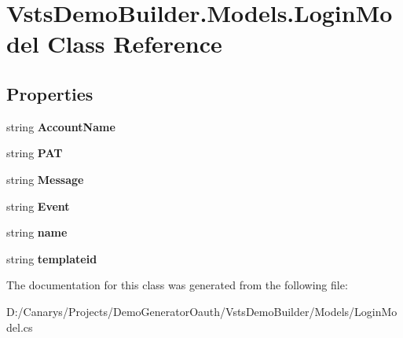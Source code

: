 \hypertarget{class_vsts_demo_builder_1_1_models_1_1_login_model}{}\section{Vsts\+Demo\+Builder.\+Models.\+Login\+Model Class Reference}
\label{class_vsts_demo_builder_1_1_models_1_1_login_model}
\subsection*{Properties}
\begin{DoxyCompactItemize}
\item 
\mbox{\label{class_vsts_demo_builder_1_1_models_1_1_login_model_a6f209339823fa33195a7def95a4d3b9d}} 
string {\bfseries Account\+Name}
\item 
\mbox{\label{class_vsts_demo_builder_1_1_models_1_1_login_model_a122f945e352c68056de07da5d7210735}} 
string {\bfseries P\+AT}
\item 
\mbox{\label{class_vsts_demo_builder_1_1_models_1_1_login_model_af7d1a8a1ba5838923f177f2a2fb97077}} 
string {\bfseries Message}
\item 
\mbox{\label{class_vsts_demo_builder_1_1_models_1_1_login_model_a62b348381f38b140681f5033d84a4c24}} 
string {\bfseries Event}
\item 
\mbox{\label{class_vsts_demo_builder_1_1_models_1_1_login_model_a886e886d769c190d7dbce95c2ea910c4}} 
string {\bfseries name}
\item 
\mbox{\label{class_vsts_demo_builder_1_1_models_1_1_login_model_ac9c49546450495d8133bb0b3ddd612e6}} 
string {\bfseries templateid}
\end{DoxyCompactItemize}


The documentation for this class was generated from the following file\+:\begin{DoxyCompactItemize}
\item 
D\+:/\+Canarys/\+Projects/\+Demo\+Generator\+Oauth/\+Vsts\+Demo\+Builder/\+Models/Login\+Model.\+cs\end{DoxyCompactItemize}
